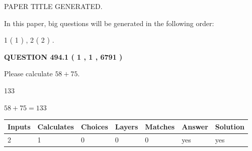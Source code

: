 \documentclass[12pt]{article}
\begin{document}
   
   
   
   
   
 \vspace{0.2in}
 
 
 
 
   
   
 PAPER TITLE GENERATED.
   
   
   
\vspace{0.2in}
   
In this paper, big questions will be generated in the following order: 
   
   
   1 ( 1 )
 ,
   2 ( 2 )
 .
  
\vspace{0.2in}
  
{\textbf{\Large{QUESTION
494.1 
 ( 1 , 1 , 6791 )
}}}
  
  
 
Please calculate $ %
58 +  %
75 $.
 
 
 
\noindent{}
 
 

133
 
 
\noindent{}
 
 

 
 
 
\noindent{}
 
 

$ %
58 +  %
75=   %
133$
 
 
\noindent{}
 
 

 
   
   
   
   
\noindent\begin{tabular}{|l|l|l|l|l|l|l|}
 \hline
Inputs & Calculates & Choices & Layers & Matches & Answer & Solution \\ \hline
 2  & 
 1  & 
 0
  & 
 0  & 
 0  & 
  yes & 
  yes 
  \\ \hline
 \end{tabular}
   
   
   
   
\noindent{}
   
\end{document}

